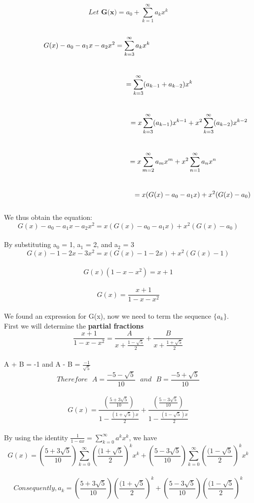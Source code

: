 \documentclass[12pt]{article}
\begin{document}
\[Let \textbf{  G(x)} = a_{0} + \sum_{k=1}^{\infty} a_{k}x^{k} \]\\
\[\hspace*{-3.2cm}G(x) - a_{0} - a_{1}x - a_{2}x^2 = \sum_{k=3}^{\infty} a_{k}x^{k} \]\\
\[\hspace*{3.2cm} = \sum_{k=3}^{\infty} (a_{k-1} + a_{k-2})x^{k} \]\\
\[\hspace*{6.2cm} = x\sum_{k=3}^{\infty} (a_{k-1})x^{k-1} + x^{2}\sum_{k=3}^{\infty}(a_{k-2})x^{k-2} \]\\
\[\hspace*{4.6cm}= x\sum_{m=2}^{\infty} a_{m}x^{m} + x^{2}\sum_{n=1}^{\infty}a_{n}x^{n} \]\\
\[\hspace*{6.6cm} = x(G(x) - a_{0} - a_{1}x) + x^{2}(G(x)- a_0) \]\\
We thus obtain the equation:\\
\[G(x) - a_{0} - a_{1}x - a_{2}x^2  = x(G(x) - a_{0} - a_{1}x) + x^{2}(G(x)- a_0)\]\\
By substituting a$_{0}$ = 1, a$_{1}$ = 2, and a$_{2}$ = 3\\
\[ G(x) - 1 - 2x -3x^2= x(G(x) - 1 - 2x) + x^{2}(G(x) - 1) \]\\
\[ G(x)(1 - x - x^{2}) =  x+1 \]\\
\[ G(x) =  \frac{x+1}{1 - x - x^{2}}\]\\
We found an expression for G(x), now we need to term the sequence $\{a_{k}\}$.\\
First we will determine the \textbf{partial fractions}\\
\[\frac{x+1}{1- x - x^{2}} = \frac{A}{x + \frac{1 - \sqrt{5}}{2}} + \frac{B}{x + \frac{1 + \sqrt{5}}{2}}\]\\
\hspace*{3cm}A + B = -1 and A - B = $\frac{-1}{\sqrt{5}}$\\
\[Therefore \text{ } A = \frac{-5 - \sqrt{5}}{10} \text{ } and \text{ } B = \frac{-5 + \sqrt{5}}{10}\]\\
\[ G(x)  = \frac{(\frac{5 + 3\sqrt{5}}{10})}{1 - \frac{(1 + \sqrt{5})x}{2}} + \frac{(\frac{5 - 3\sqrt{5}}{10})}{1 - \frac{(1 - \sqrt{5})x}{2}}\]\\
By using the identity $\frac{1}{1 - ax} = \sum_{k=0}^{\infty}a^{k}x^{k}$, we have\\
\[ G(x)  = (\frac{5 + 3\sqrt{5}}{10})\sum_{k=0}^{\infty} (\frac{(1 + \sqrt{5}}{2})^{k}x^{k} + (\frac{5 - 3\sqrt{5}}{10})\sum_{k=0}^{\infty} (\frac{(1 - \sqrt{5}}{2})^{k}x^{k}\]\\
\[Consequently, a_{k} = (\frac{5 + 3\sqrt{5}}{10})(\frac{(1 + \sqrt{5}}{2})^{k} + (\frac{5 - 3\sqrt{5}}{10})(\frac{(1 - \sqrt{5}}{2})^{k}\]\\
\vspace*{0.6cm}\\
\end{document}
